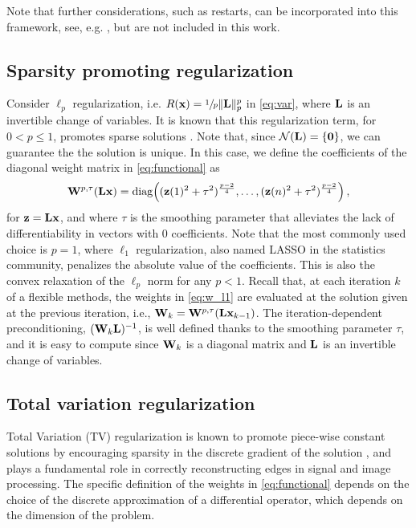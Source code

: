 \documentclass[11pt]{article}
\numberwithin{equation}{section}
\newcommand{\diag} [1]  {{\rm diag\!}\left( #1 \right)}    %
\newcommand{\bfL}{{\bf L}}
\newcommand{\bfW}{{\bf W}}
\newcommand{\bfx}{{\bf x}}
\newcommand{\bfz}{{\bf z}}
\begin{document}
Note that further considerations, such as restarts, can be incorporated into this framework, see, e.g. \cite{Gazzola2021inexact,onisk2025restarts}, but %
are not included in this work.%
\subsection{Sparsity promoting regularization}
Consider $\ell_p$ regularization, i.e. $R(\bfx)=\sfrac{1}{p}\|\bfL\|_p^p$ in \eqref{eq:var}, where $\bfL$ is an invertible change of variables. It is known that this regularization term, for $0<p\leq 1$, promotes sparse solutions \cite{Fornasier2010CS}. Note that, since $\mathcal{N}(\bfL)=\{\bf0\}$, we can guarantee the the solution is unique. In this case, we define the coefficients of the diagonal weight matrix in \eqref{eq:functional} as
\begin{equation}\label{eq:w_l1}
\bfW^{p, \tau}(\bfL \bfx)= \diag{(\bfz(1)^{2} + \tau^2)^{\frac{p-2}{4}},\dots, (\bfz(n)^{2}+ \tau^2)^{\frac{p-2}{4}}},
\end{equation}
for $\bfz = \bfL \bfx$, and where $\tau$ is the smoothing parameter that alleviates the lack of differentiability in vectors with $0$ coefficients. Note that the most commonly used choice is $p=1$, where $\ell_1$ regularization, also named LASSO in the statistics community, penalizes the absolute value of the coefficients. This is also the convex relaxation of the $\ell_p$ norm for any $p<1$. Recall that, at each iteration $k$ of a flexible methods, the weights in \eqref{eq:w_l1} are evaluated at the solution given at the previous iteration, i.e., $\bfW_k=\bfW^{p, \tau}(\bfL \bfx_{k-1})$. The iteration-dependent preconditioning, $(\bfW_k \bfL)^{-1}$, is well defined thanks to the smoothing parameter $\tau$, and it is easy to compute since $\bfW_k$ is a diagonal matrix and $\bfL$ is an invertible change of variables. 

\subsection{Total variation regularization}
Total Variation (TV) regularization is known to promote piece-wise constant solutions by encouraging sparsity in the discrete gradient of the solution \cite{rudin1992nonlinear}, and plays a fundamental role in correctly reconstructing edges in signal and image processing. The specific definition of the weights in \eqref{eq:functional} depends on the choice of the discrete approximation of a
differential operator, which depends on the dimension of the problem. 
\end{document}
